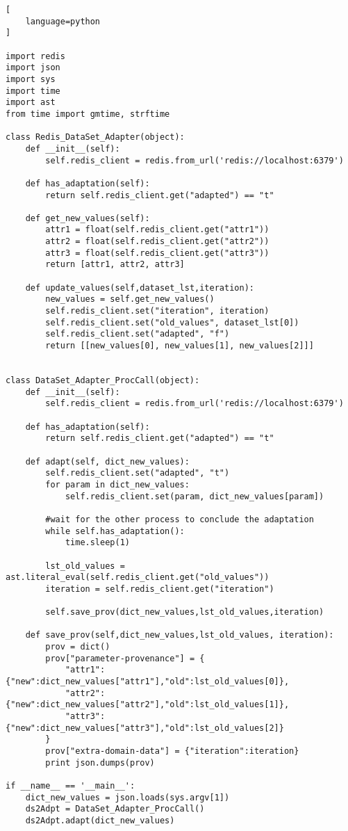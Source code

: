 \begin{lstlisting}[
    language=python
]

import redis
import json
import sys
import time
import ast
from time import gmtime, strftime

class Redis_DataSet_Adapter(object):
    def __init__(self):
        self.redis_client = redis.from_url('redis://localhost:6379')

    def has_adaptation(self):
        return self.redis_client.get("adapted") == "t"

    def get_new_values(self):
        attr1 = float(self.redis_client.get("attr1"))
        attr2 = float(self.redis_client.get("attr2"))
        attr3 = float(self.redis_client.get("attr3"))
        return [attr1, attr2, attr3]

    def update_values(self,dataset_lst,iteration):
        new_values = self.get_new_values()
        self.redis_client.set("iteration", iteration)
        self.redis_client.set("old_values", dataset_lst[0])
        self.redis_client.set("adapted", "f")
        return [[new_values[0], new_values[1], new_values[2]]]


class DataSet_Adapter_ProcCall(object):
    def __init__(self):
        self.redis_client = redis.from_url('redis://localhost:6379')

    def has_adaptation(self):
        return self.redis_client.get("adapted") == "t"

    def adapt(self, dict_new_values):
        self.redis_client.set("adapted", "t")
        for param in dict_new_values:
            self.redis_client.set(param, dict_new_values[param])

        #wait for the other process to conclude the adaptation
        while self.has_adaptation():
            time.sleep(1)

        lst_old_values = ast.literal_eval(self.redis_client.get("old_values"))
        iteration = self.redis_client.get("iteration")

        self.save_prov(dict_new_values,lst_old_values,iteration)

    def save_prov(self,dict_new_values,lst_old_values, iteration):
        prov = dict()
        prov["parameter-provenance"] = {
            "attr1": {"new":dict_new_values["attr1"],"old":lst_old_values[0]},
            "attr2": {"new":dict_new_values["attr2"],"old":lst_old_values[1]},
            "attr3": {"new":dict_new_values["attr3"],"old":lst_old_values[2]}
        }
        prov["extra-domain-data"] = {"iteration":iteration}
        print json.dumps(prov)

if __name__ == '__main__':
    dict_new_values = json.loads(sys.argv[1])
    ds2Adpt = DataSet_Adapter_ProcCall()
    ds2Adpt.adapt(dict_new_values)

\end{lstlisting}

